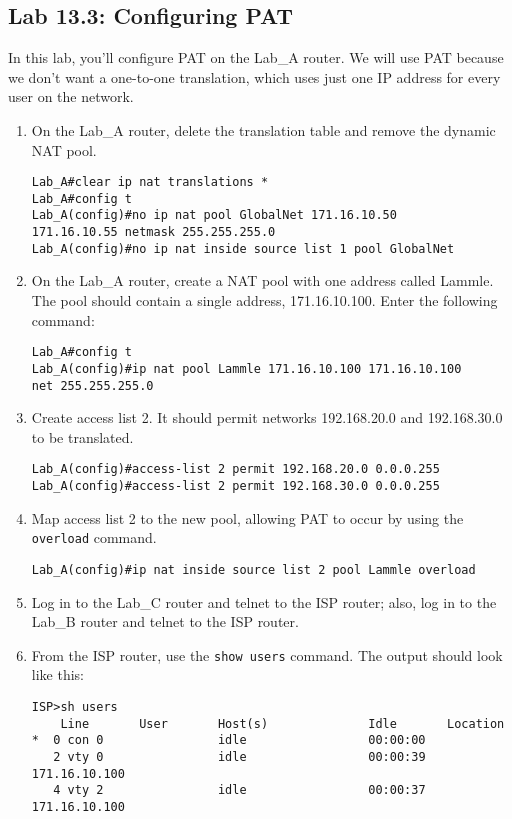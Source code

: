 \subsection{Lab 13.3: Configuring PAT}

In this lab, you'll configure PAT on the Lab\_A router. We will use PAT
because we don't want a one-to-one translation, which uses just one IP
address for every user on the network.

\begin{enumerate}
\item
  On the Lab\_A router, delete the translation table and remove the
  dynamic NAT pool.

\begin{verbatim}
Lab_A#clear ip nat translations *
Lab_A#config t
Lab_A(config)#no ip nat pool GlobalNet 171.16.10.50
171.16.10.55 netmask 255.255.255.0
Lab_A(config)#no ip nat inside source list 1 pool GlobalNet
\end{verbatim}
\item
  On the Lab\_A router, create a NAT pool with one address called
  Lammle. The pool should contain a single address, 171.16.10.100. Enter
  the following command:

\begin{verbatim}
Lab_A#config t
Lab_A(config)#ip nat pool Lammle 171.16.10.100 171.16.10.100
net 255.255.255.0
\end{verbatim}
\item
  Create access list 2. It should permit networks 192.168.20.0 and
  192.168.30.0 to be translated.

\begin{verbatim}
Lab_A(config)#access-list 2 permit 192.168.20.0 0.0.0.255
Lab_A(config)#access-list 2 permit 192.168.30.0 0.0.0.255
\end{verbatim}
\item
  Map access list 2 to the new pool, allowing PAT to occur by using the
  \texttt{overload} command.

\begin{verbatim}
Lab_A(config)#ip nat inside source list 2 pool Lammle overload
\end{verbatim}
\item
  Log in to the Lab\_C router and telnet to the ISP router; also, log in
  to the Lab\_B router and telnet to the ISP router.
\item
  From the ISP router, use the \texttt{show\ users} command. The output
  should look like this:

\begin{verbatim}
ISP>sh users
    Line       User       Host(s)              Idle       Location
*  0 con 0                idle                 00:00:00
   2 vty 0                idle                 00:00:39 171.16.10.100
   4 vty 2                idle                 00:00:37 171.16.10.100
 

\end{verbatim}
\end{enumerate}
